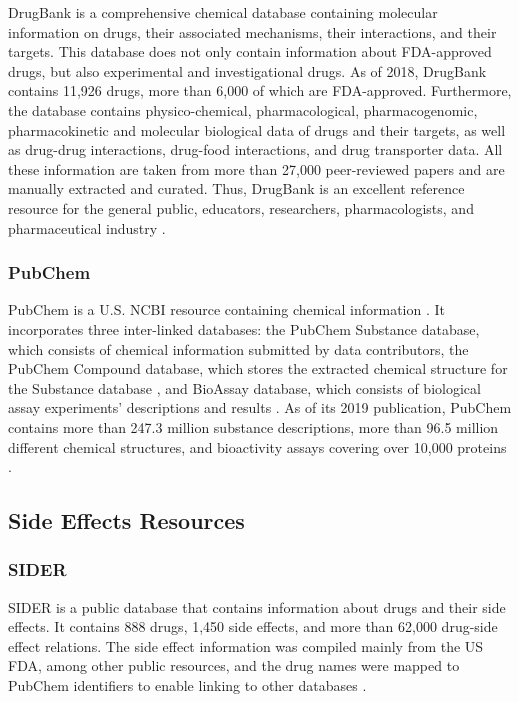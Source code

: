 DrugBank is a comprehensive chemical database containing  molecular information on drugs, their associated mechanisms, their interactions, and their targets.
This database does not only contain information about \ac{FDA}-approved drugs, but also experimental and investigational drugs.
As of 2018, DrugBank contains 11,926 drugs, more than 6,000 of which are \ac{FDA}-approved.
Furthermore, the database contains physico-chemical, pharmacological, pharmacogenomic, pharmacokinetic and molecular biological data of drugs and their targets, as well as drug-drug interactions, drug-food interactions, and drug transporter data.
All these information are taken from more than 27,000 peer-reviewed papers and are manually extracted and curated.
Thus, DrugBank is an excellent reference resource for the general public, educators, researchers, pharmacologists, and pharmaceutical industry \cite{wishart_drugbank_2018}.

\subsubsection{PubChem}

PubChem is a U.S. \ac{NCBI} resource containing chemical information \cite{kim_pubchem_2019}.
It incorporates three inter-linked databases: the PubChem Substance database, which consists of chemical information submitted by data contributors, the PubChem Compound database, which stores the extracted chemical structure for the Substance database \cite{kim_pubchem_2016}, and BioAssay database, which consists of biological assay experiments’ descriptions and results \cite{kim_pubchem_2019}.
As of its 2019 publication, PubChem contains more than 247.3 million substance descriptions, more than 96.5 million different chemical structures, and bioactivity assays covering over 10,000 proteins \cite{kim_pubchem_2019}.

\subsection{Side Effects Resources}

\subsubsection{SIDER}

\ac{SIDER} is a public database that contains information about drugs and their side effects.
It contains 888 drugs, 1,450 side effects, and more than 62,000 drug-side effect relations.
The side effect information was compiled mainly from the US \ac{FDA}, among other public resources, and the drug names were mapped to PubChem identifiers to enable linking to other databases \cite{kuhn_side_2010}.

